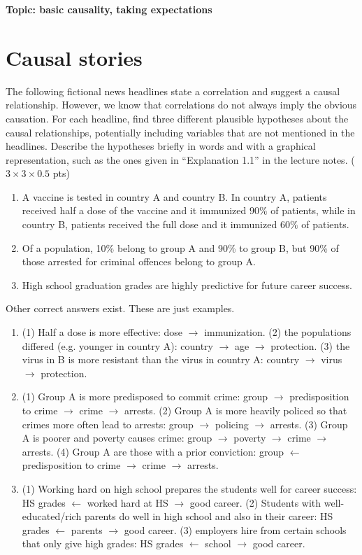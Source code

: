 


\flushleft\textbf{Topic: basic causality, taking expectations}


\section{Causal stories}
The following fictional news headlines state a correlation and suggest a causal relationship. However, we know that correlations do not always imply the obvious causation. For each headline, find three different plausible hypotheses about the causal relationships, potentially including variables that are not mentioned in the headlines. Describe the hypotheses briefly in words and with a graphical representation, such as the ones given in ``Explanation 1.1'' in the lecture notes. ($3 \times 3 \times 0.5$ pts)

\begin{enumerate}
    \item A vaccine is tested in country A and country B. In country A, patients received half a dose of the vaccine and it immunized $90\%$ of patients, while in country B, patients received the full dose and it immunized $60\%$ of patients.
    \item Of a population, 10\% belong to group A and 90\% to group B, but 90\% of those arrested for criminal offences belong to group A.
    \item High school graduation grades are highly predictive for future career success.
\end{enumerate}
\begin{gradedsolution}
Other correct answers exist. These are just examples.
\begin{enumerate}
    \item (1) Half a dose is more effective: dose $\to$ immunization. (2) the populations differed (e.g. younger in country A): country $\to$ age $\to$ protection. (3) the virus in B is more resistant than the virus in country A: country $\to$ virus $\to$ protection.
    \item (1) Group A is more predisposed to commit crime: group $\to$ predisposition to crime $\to$ crime $\to$ arrests. (2) Group A is more heavily policed so that crimes more often lead to arrests: group $\to$ policing $\to$ arrests. (3) Group A is poorer and poverty causes crime: group $\to$ poverty $\to$ crime $\to$ arrests. (4) Group A are those with a prior conviction: group $\leftarrow$ predisposition to crime $\to$ crime $\to$ arrests.
    \item (1) Working hard on high school prepares the students well for career success: HS grades $\leftarrow$ worked hard at HS $\rightarrow$ good career. (2) Students with well-educated/rich parents do well in high school and also in their career: HS grades $\leftarrow$ parents $\to$ good career. (3) employers hire from certain schools that only give high grades: HS grades $\leftarrow$ school $\to$ good career.
\end{enumerate}
\end{gradedsolution}

